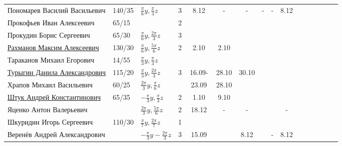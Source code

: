 \documentclass[a4paper,landscape,11pt]{article}
\begin{document}
\begin{tabular}{l|llccccccccccccc}
\midrule                                  
	Пономарев Василий Васильевич	&140/35&$\frac{\pi}{6}y,\frac{\pi}{3}z$&3&8.12&-&-&-&-&8.12\\
	Прокофьев Иван Алексеевич	&65/15 &&2&       &\\	
	Прокудин Борис Сергеевич	&65/30 &$\frac{\pi}{6}y,\frac{2\pi}{3}z$&3&       &\\	
	\href{}{Рахманов Максим Алексеевич}	        &130/30&$\frac{\pi}{6}y,\frac{5\pi}{6}z$&2&2.10&2.10&\\	
Тараканов Михаил Егорович	&14/55&$\frac{\pi}{3}y,\frac{\pi}{3}z$&       &\\	
	\href{}{Турыгин Данила Александрович}	        &115/20&$\frac{\pi}{3}y,\frac{2\pi}{3}z$&3&\,16.09-\,&28.10&30.10\\
	Храпов Михаил Васильевич	&60/25 &$\frac{2\pi}{3}y,\frac{\pi}{6}z$ &&23.09&28.10\\	
\midrule                                    
	\href{}{Штук Андрей Константинович}	                &65/35 &$-\frac{\pi}{3}y,\frac{\pi}{3}z$&2&1.10&9.10\\	
	Яценко Антон Валерьевич		&  &$\frac{2\pi}{3}y,\frac{5\pi}{6}z$&2 &18.12&-&-&&&-\\
	Шкуридин Игорь Сергеевич	&110/30&$\frac{\pi}{7}y,\frac{2\pi}{7}z$&1&       &\\	
	Веренёв Андрей Александрович	&  &$-\!\frac{\pi}{3}y\!-\!\frac{2\pi}{3}z\!$&3&\,15.09\,&&8.12&&-&8.12&\\
\bottomrule
\end{tabular}
\end{document}

